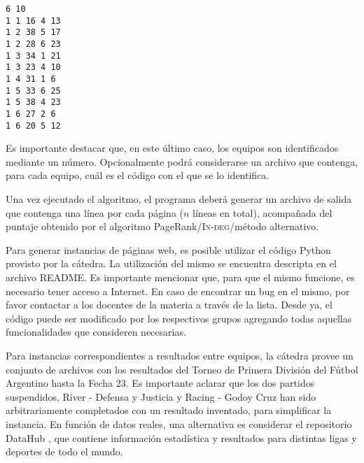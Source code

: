 \begin{verbatim}
6 10
1 1 16 4 13
1 2 38 5 17
1 2 28 6 23
1 3 34 1 21
1 3 23 4 10
1 4 31 1 6
1 5 33 6 25
1 5 38 4 23
1 6 27 2 6
1 6 20 5 12
\end{verbatim}

Es importante destacar que, en este \'ultimo caso, los equipos son identificados mediante un n\'umero. Opcionalmente podr\'a considerarse un archivo que contenga, 
para cada equipo, cu\'al es el c\'odigo con el que se lo identifica.

Una vez ejecutado el algoritmo, el programa deber\'a generar un archivo de salida que contenga una l\'inea por cada
p\'agina ($n$ l\'ineas en total), acompa\~nada del puntaje obtenido por el algoritmo PageRank/\textsc{In-deg}/m\'etodo alternativo. 

Para generar instancias de p\'aginas web, es posible utilizar el c\'odigo Python provisto por la c\'atedra. La utilizaci\'on del mismo se
encuentra descripta en el archivo README. Es importante mencionar que, para que el mismo funcione, es
necesario tener acceso a Internet. En caso de encontrar un bug en el mismo, por favor contactar a los docentes de la
materia a trav\'es de la lista. Desde ya, el c\'odigo puede ser modificado por los respectivos grupos agregando todas
aquellas funcionalidades que consideren necesarias.

Para instancias correspondientes a resultados entre equipos, la c\'atedra provee un conjunto de archivos con los resultados del Torneo de Primera Divisi\'on 
del F\'utbol Argentino hasta la Fecha 23. Es importante aclarar que los dos partidos suspendidos, River - Defensa y Justicia y Racing - Godoy Cruz han sido 
arbitrariamente completados con un resultado inventado, para simplificar la instancia. En funci\'on de datos reales, una alternativa es considerar el 
repositorio DataHub \cite{datahub}, que contiene informaci\'on estad\'istica y resultados para distintas ligas y deportes de todo el mundo.

\vskip 5pt

%

%
